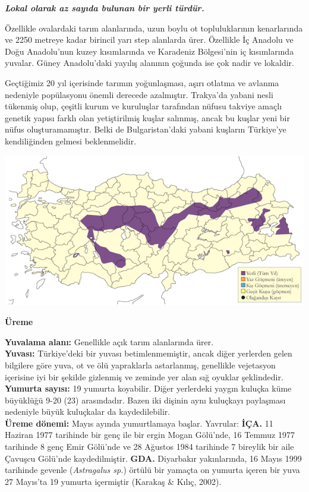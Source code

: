 \documentclass[
  a4paper,
  DIV=11,
  numbers=noendperiod]{scrreprt}
\begin{document}
\textbf{\emph{Lokal olarak az sayıda bulunan bir yerli türdür.}}

Özellikle ovalardaki tarım alanlarında, uzun boylu ot topluluklarının
kenarlarında ve 2250 metreye kadar birincil yarı step alanlarda ürer.
Özellikle İç Anadolu ve Doğu Anadolu'nun kuzey kısımlarında ve Karadeniz
Bölgesi'nin iç kısımlarında yuvalar. Güney Anadolu'daki yayılış alanının
çoğunda ise çok nadir ve lokaldir.

Geçtiğimiz 20 yıl içerisinde tarımın yoğunlaşması, aşırı otlatma ve
avlanma nedeniyle popülasyonu önemli derecede azalmıştır. Trakya'da
yabani nesli tükenmiş olup, çeşitli kurum ve kuruluşlar tarafından
nüfusu takviye amaçlı genetik yapısı farklı olan yetiştirilmiş kuşlar
salınmış, ancak bu kuşlar yeni bir nüfus oluşturamamıştır. Belki de
Bulgaristan'daki yabani kuşların Türkiye'ye kendiliğinden gelmesi
beklenmelidir.

\includegraphics{images/harita_Page_042.png}

\textbf{Üreme}

\textbf{Yuvalama alanı:} Genellikle açık tarım alanlarında ürer.\\
\textbf{Yuvası:} Türkiye'deki bir yuvası betimlenmemiştir, ancak diğer
yerlerden gelen bilgilere göre yuva, ot ve ölü yapraklarla astarlanmış,
genellikle vejetasyon içerisine iyi bir şekilde gizlenmiş ve zeminde yer
alan sığ oyuklar şeklindedir.\\
\textbf{Yumurta sayısı:} 19 yumurta koyabilir. Diğer yerlerdeki yaygın
kuluçka küme büyüklüğü 9-20 (23) arasındadır. Bazen iki dişinin aynı
kuluçkayı paylaşması nedeniyle büyük kuluçkalar da kaydedilebilir.\\
\textbf{Üreme dönemi:} Mayıs ayında yumurtlamaya başlar. Yavrular:
\textbf{İÇA.} 11 Haziran 1977 tarihinde bir genç ile bir ergin Mogan
Gölü'nde, 16 Temmuz 1977 tarihinde 8 genç Emir Gölü'nde ve 28 Ağustos
1984 tarihinde 7 bireylik bir aile Çavuşcu Gölü'nde kaydedilmiştir.
\textbf{GDA.} Diyarbakır yakınlarında, 16 Mayıs 1999 tarihinde gevenle
(\emph{Astragalus sp.}) örtülü bir yamaçta on yumurta içeren bir yuva 27
Mayıs'ta 19 yumurta içermiştir (Karakaş \& Kılıç, 2002).
\end{document}
